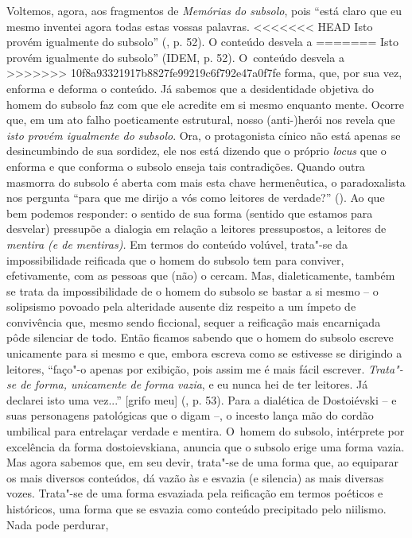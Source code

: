 {Voltemos, agora, aos fragmentos de \emph{Memórias do subsolo}, pois
``está claro que eu mesmo inventei agora todas estas vossas palavras.
<<<<<<< HEAD
Isto provém igualmente do subsolo'' (, p. 52). O conteúdo desvela a
=======
Isto provém igualmente do subsolo'' (IDEM, p. 52). O~conteúdo desvela a
>>>>>>> 10f8a93321917b8827fe99219c6f792e47a0f7fe
forma, que, por sua vez, enforma e deforma o conteúdo. Já sabemos que a
desidentidade objetiva do homem do subsolo faz com que ele acredite em
si mesmo enquanto mente. Ocorre que, em um ato falho poeticamente
estrutural, nosso (anti-)herói nos revela que \emph{isto provém
igualmente do subsolo}. Ora, o protagonista cínico não está apenas se
desincumbindo de sua sordidez, ele nos está dizendo que o próprio
\emph{locus} que o enforma e que conforma o subsolo enseja tais
contradições. Quando outra masmorra do subsolo é aberta com mais esta
chave hermenêutica, o paradoxalista nos pergunta ``para que me dirijo a
vós como leitores de verdade?'' (). Ao que bem podemos responder:
o sentido de sua forma (sentido que estamos para desvelar) pressupõe a
dialogia em relação a leitores pressupostos, a leitores de \emph{mentira
(e de mentiras).} Em termos do conteúdo volúvel, trata"-se da
impossibilidade reificada que o homem do subsolo tem para conviver,
efetivamente, com as pessoas que (não) o cercam. Mas, dialeticamente,
também se trata da impossibilidade de o homem do subsolo se bastar a si
mesmo -- o solipsismo povoado pela alteridade ausente diz respeito a um
ímpeto de convivência que, mesmo sendo ficcional, sequer a reificação
mais encarniçada pôde silenciar de todo. Então ficamos sabendo que o
homem do subsolo escreve unicamente para si mesmo e que, embora escreva
como se estivesse se dirigindo a leitores, ``faço"-o apenas por exibição,
pois assim me é mais fácil escrever. \emph{Trata"-se de forma, unicamente
de forma vazia}, e eu nunca hei de ter leitores. Já declarei isto uma
vez...'' {[}grifo meu{]} (, p. 53). Para a dialética de Dostoiévski
-- e suas personagens patológicas que o digam --, o incesto lança mão do
cordão umbilical para entrelaçar verdade e mentira. O~homem do subsolo,
intérprete por excelência da forma dostoievskiana, anuncia que o subsolo
erige uma forma vazia. Mas agora sabemos que, em seu devir, trata"-se de
uma forma que, ao equiparar os mais diversos conteúdos, dá vazão às e
esvazia (e silencia) as mais diversas vozes. Trata"-se de uma forma
esvaziada pela reificação em termos poéticos e históricos, uma forma que
se esvazia como conteúdo precipitado pelo niilismo. Nada pode perdurar,
}
